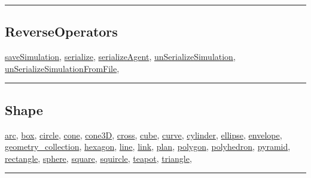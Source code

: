\documentclass[]{book}
\theoremstyle{definition}
\theoremstyle{definition}
\theoremstyle{definition}
\theoremstyle{remark}
\begin{document}
\begin{center}\rule{0.5\linewidth}{\linethickness}\end{center}

\subsection{ReverseOperators}\label{reverseoperators}

\href{operators-s-to-z.html\#savesimulation}{saveSimulation},
\href{operators-s-to-z.html\#serialize}{serialize},
\href{operators-s-to-z.html\#serializeagent}{serializeAgent},
\href{operators-s-to-z.html\#unserializesimulation}{unSerializeSimulation},
\href{operators-s-to-z.html\#unserializesimulationfromfile}{unSerializeSimulationFromFile},

\begin{center}\rule{0.5\linewidth}{\linethickness}\end{center}

\subsection{Shape}\label{shape}

\href{operators-a-to-a.html\#arc}{arc},
\href{operators-b-to-c.html\#box}{box},
\href{operators-b-to-c.html\#circle}{circle},
\href{operators-b-to-c.html\#cone}{cone},
\href{operators-b-to-c.html\#cone3d}{cone3D},
\href{operators-b-to-c.html\#cross}{cross},
\href{operators-b-to-c.html\#cube}{cube},
\href{operators-b-to-c.html\#curve}{curve},
\href{operators-b-to-c.html\#cylinder}{cylinder},
\href{operators-d-to-h.html\#ellipse}{ellipse},
\href{operators-d-to-h.html\#envelope}{envelope},
\href{operators-d-to-h.html\#geometry_collection}{geometry\_collection},
\href{operators-d-to-h.html\#hexagon}{hexagon},
\href{operators-i-to-m.html\#line}{line},
\href{operators-i-to-m.html\#link}{link},
\href{operators-n-to-r.html\#plan}{plan},
\href{operators-n-to-r.html\#polygon}{polygon},
\href{operators-n-to-r.html\#polyhedron}{polyhedron},
\href{operators-n-to-r.html\#pyramid}{pyramid},
\href{operators-n-to-r.html\#rectangle}{rectangle},
\href{operators-s-to-z.html\#sphere}{sphere},
\href{operators-s-to-z.html\#square}{square},
\href{operators-s-to-z.html\#squircle}{squircle},
\href{operators-s-to-z.html\#teapot}{teapot},
\href{operators-s-to-z.html\#triangle}{triangle},

\begin{center}\rule{0.5\linewidth}{\linethickness}\end{center}
\end{document}
